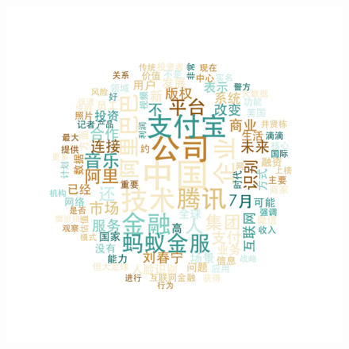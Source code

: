 \documentclass{beamer}
\begin{document}
\begin{frame}
\begin{figure}
    \includegraphics[height=0.3\textheight]{plot/Jul-wordcloud.png}\\

  \end{figure}
\end{frame}
\end{document}
